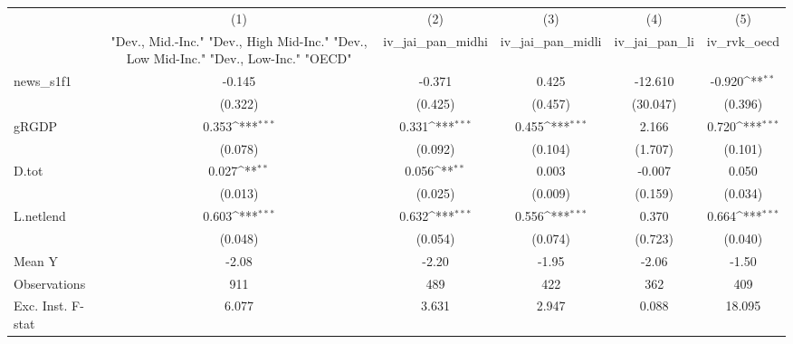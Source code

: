 {
\def\sym#1{\ifmmode^{#1}\else\(^{#1}\)\fi}
\begin{tabular}{l*{5}{c}}
\toprule
            &\multicolumn{1}{c}{(1)}&\multicolumn{1}{c}{(2)}&\multicolumn{1}{c}{(3)}&\multicolumn{1}{c}{(4)}&\multicolumn{1}{c}{(5)}\\
            &\multicolumn{1}{c}{ "Dev., Mid.-Inc." "Dev., High Mid-Inc." "Dev., Low Mid-Inc." "Dev., Low-Inc." "OECD" }&\multicolumn{1}{c}{iv\_jai\_pan\_midhi}&\multicolumn{1}{c}{iv\_jai\_pan\_midli}&\multicolumn{1}{c}{iv\_jai\_pan\_li}&\multicolumn{1}{c}{iv\_rvk\_oecd}\\
\midrule
news\_s1f1   &      -0.145         &      -0.371         &       0.425         &     -12.610         &      -0.920\sym{**} \\
            &     (0.322)         &     (0.425)         &     (0.457)         &    (30.047)         &     (0.396)         \\
\addlinespace
gRGDP       &       0.353\sym{***}&       0.331\sym{***}&       0.455\sym{***}&       2.166         &       0.720\sym{***}\\
            &     (0.078)         &     (0.092)         &     (0.104)         &     (1.707)         &     (0.101)         \\
\addlinespace
D.tot       &       0.027\sym{**} &       0.056\sym{**} &       0.003         &      -0.007         &       0.050         \\
            &     (0.013)         &     (0.025)         &     (0.009)         &     (0.159)         &     (0.034)         \\
\addlinespace
L.netlend   &       0.603\sym{***}&       0.632\sym{***}&       0.556\sym{***}&       0.370         &       0.664\sym{***}\\
            &     (0.048)         &     (0.054)         &     (0.074)         &     (0.723)         &     (0.040)         \\
\midrule
Mean Y      &       -2.08         &       -2.20         &       -1.95         &       -2.06         &       -1.50         \\
Observations&         911         &         489         &         422         &         362         &         409         \\
Exc. Inst. F-stat&       6.077         &       3.631         &       2.947         &       0.088         &      18.095         \\
\bottomrule
\end{tabular}
}
